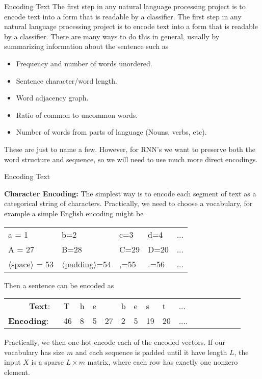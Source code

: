 \documentclass[10pt, table, dvipsnames,xcdraw, handout]{beamer}
\begin{document}
\begin{frame}[fragile]{Encoding Text}
The first step in any natural language processing project is to encode text into a form that is readable by a classifier. The first step in any natural language processing project is to encode text into a form that is readable by a classifier. There are many ways to do this in general, usually by summarizing information about the sentence such as

\begin{itemize}
\item Frequency and number of words unordered. 
\item Sentence character/word length.
\item Word adjacency graph. 
\item Ratio of common to uncommon words. 
\item Number of words from parts of language (Nouns, verbs, etc).
\end{itemize} 

These are just to name a few. However, for RNN's we want to preserve both the word structure and sequence, so we will need to use much more direct encodings. 

\end{frame}






\begin{frame}[fragile]{Encoding Text}

\textbf{Character Encoding:} The simplest way is to encode each segment of text as a categorical string of characters. Practically, we need to choose a vocabulary, for example a simple English encoding might be
\begin{center}
\begin{tabular}{lllll}
a = 1& b=2 & c=3 & d=4 &...
\\
A = 27& B=28 & C=29 & D=20&...
\\
 $\langle$space$\rangle$ = 53& $\langle$padding$\rangle$=54 & ,=55 & .=56 & ...
\end{tabular}
\end{center}
Then a sentence can be encoded as
\begin{center}
\begin{tabular}{rlllllllllllllll}
\textbf{Text}:\,\,\,\,&T&h&e& &b&e&s&t&...
\\
\textbf{Encoding}: \,\,\,& 46&8&5&27&2&5&19&20&....
\end{tabular}
\end{center}

Practically, we then one-hot-encode each of the encoded vectors. If our vocabulary has size $m$ and each sequence is padded until it have length $L$, the input $X$ is a sparse $L\times m$ matrix, where each row has exactly one nonzero element. 
\end{frame}
\end{document}
